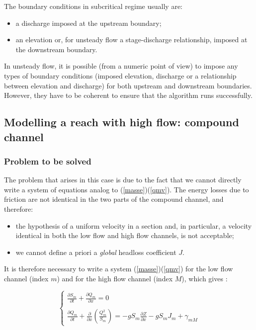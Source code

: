 The boundary conditions in subcritical regime usually are:
\begin{itemize}
 \item a discharge imposed at the upstream boundary;
 \item an elevation or, for unsteady flow a stage-discharge relationship, imposed at the downstream boundary.
\end{itemize}

In unsteady flow, it is possible (from a numeric point of view) to impose any types of boundary conditions (imposed elevation, discharge or a relationship between elevation and discharge) for both upstream and downstream boundaries. However, they have to be coherent to ensure that the algorithm runs successfully.

\subsection{Modelling a reach with high flow: compound channel}

\subsubsection{Problem to be solved}

The problem that arises in this case is due to the fact that we cannot directly write a system of equations analog to (\ref{masse})(\ref{qmv}). The energy losses due to friction are not identical in the two parts of the compound channel, and therefore:
\begin{itemize}
 \item the hypothesis of a uniform velocity in a section and, in particular, a velocity identical in both the low flow and high flow channels, is not acceptable;
 \item we cannot define a priori a \textit{global} headloss coefficient $J$.
\end{itemize}

It is therefore necessary to write a system (\ref{masse})(\ref{qmv}) for the low flow channel (index $m$) and for the high flow channel (index $M$), which gives :

\begin{equation}
 \left \lbrace
  \begin{array}{l}
    \frac{\partial{S_m}}{\partial{t}} + \frac{\partial{Q_m}}{\partial{x}} = 0 \\
    \\
    \frac{\partial{Q_m}}{\partial{t}} + \frac{\partial}{\partial{x}} \left ( \frac{Q_{m}^2}{S_m} \right ) = -g S_m \frac{\partial{Z}}{\partial{x}} - g S_m J_m + \gamma_{mM}
  \end{array}
 \right.
\end{equation}

